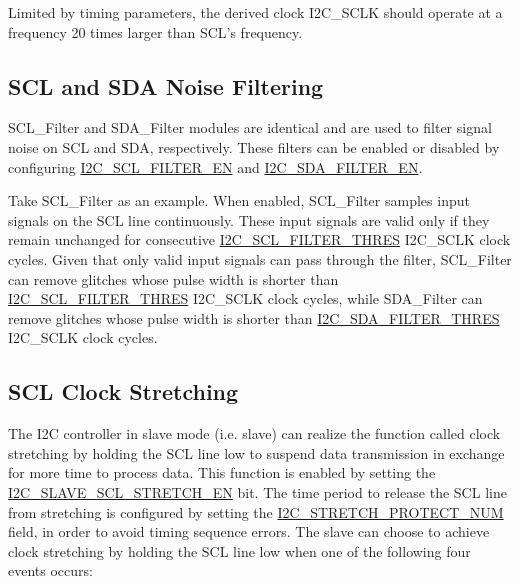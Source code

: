\documentclass[main\_\_EN.tex]{subfiles}
\begin{document}
Limited by timing parameters, the derived clock I2C\_SCLK should operate at a frequency 20 times larger than SCL's frequency.


\subsection{SCL and SDA Noise Filtering}
SCL\_Filter and SDA\_Filter modules are identical and are used to filter signal noise on SCL and SDA, respectively. These filters can be enabled or disabled by configuring \hyperref[fielddesc:I2CSCLFILTEREN]{I2C\_SCL\_FILTER\_EN} and \hyperref[fielddesc:I2CSDAFILTEREN]{I2C\_SDA\_FILTER\_EN}.

Take SCL\_Filter as an example. When enabled, SCL\_Filter samples input signals on the SCL line continuously. These input signals are valid only if they remain unchanged for consecutive \hyperref[fielddesc:I2CSCLFILTERTHRES]{I2C\_SCL\_FILTER\_THRES} I2C\_SCLK clock cycles. Given that only valid input signals can pass through the filter, SCL\_Filter can remove glitches whose pulse width is shorter than \hyperref[fielddesc:I2CSCLFILTERTHRES]{I2C\_SCL\_FILTER\_THRES} I2C\_SCLK clock cycles, while SDA\_Filter can remove glitches whose pulse width is shorter than \hyperref[fielddesc:I2CSDAFILTERTHRES]{I2C\_SDA\_FILTER\_THRES} I2C\_SCLK clock cycles.


\subsection{SCL Clock Stretching}
The I2C controller in slave mode (i.e. slave) can realize the function called clock stretching by holding the SCL line low to suspend data transmission in exchange for more time to process data. This function is enabled by setting the \hyperref[fielddesc:I2CSLAVESCLSTRETCHEN]{I2C\_SLAVE\_SCL\_STRETCH\_EN} bit. The time period to release the SCL line from stretching is configured by setting the \hyperref[fielddesc:I2CSTRETCHPROTECTNUM]{I2C\_STRETCH\_PROTECT\_NUM} field, in order to avoid timing sequence errors.
The slave can choose to achieve clock stretching by holding the SCL line low when one of the following four events occurs:
\end{document}
